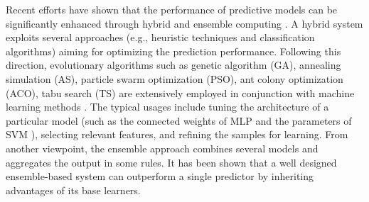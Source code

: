 Recent efforts have shown that the performance of predictive models can be significantly enhanced through hybrid and ensemble computing \cite{verikas2010hybrid}. A hybrid system exploits several approaches (e.g., heuristic techniques and classification algorithms) aiming for optimizing the prediction performance. Following this direction, evolutionary algorithms such as genetic algorithm (GA), annealing simulation (AS), particle swarm optimization (PSO), ant colony optimization (ACO), tabu search (TS) are extensively employed in conjunction with machine learning methods \cite{lin2009applying}. The typical usages include tuning the architecture of a particular model (such as the connected weights of MLP \cite{huang2008novel} and the parameters of SVM \cite{min2011tuning}), selecting relevant features, and refining the samples for learning. From another viewpoint, the ensemble approach combines several models and aggregates the output in some rules. It has been shown that a well designed ensemble-based system can outperform a single predictor by inheriting advantages of its base learners.




